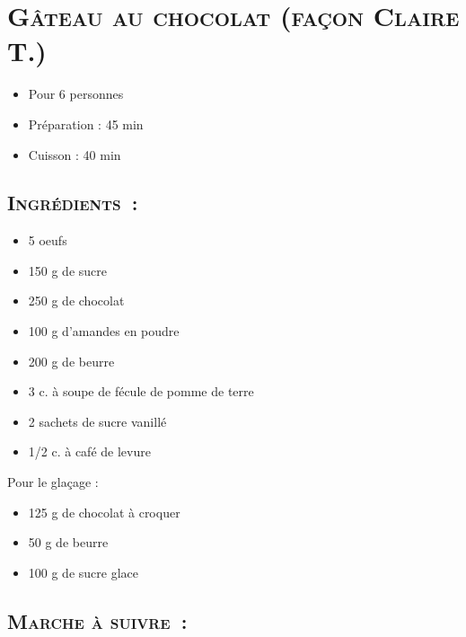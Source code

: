\section[\normalsize{G\^ateau au chocolat (fa\c con Claire T.)}]{\LARGE{\textsc{G\^ateau au chocolat (fa\c con Claire T.)}}}		%


\begin{itemize}
\item Pour 6 personnes
\item Préparation : 45 min
\item Cuisson : 40 min
\end{itemize}

\subsection*{\textsc{Ingr\'edients~:}}

\begin{itemize}
\item 5 oeufs
\item 150 g de sucre
\item 250 g de chocolat
\item 100 g d'amandes en poudre
\item 200 g de beurre
\item 3 c. \`a soupe de f\'ecule de pomme de terre
\item 2 sachets de sucre vanill\'e
\item 1/2 c. \`a caf\'e de levure
\end{itemize}

Pour le glaçage :
\begin{itemize}
\item 125 g de chocolat \`a croquer
\item 50 g de beurre
\item 100 g de sucre glace
\end{itemize}

\subsection*{\textsc{Marche \`a suivre~:}}

